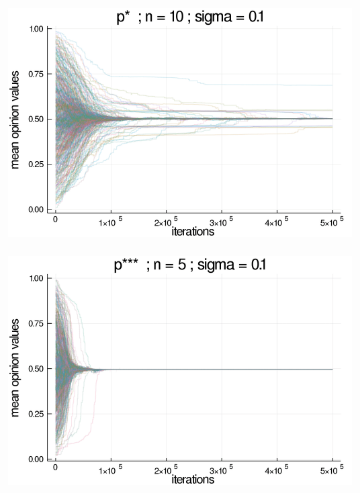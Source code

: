\documentclass{article}
\begin{document}
{\begin{figure}[H]
\begin{subfigure}[b]{0.48\textwidth}
        \includegraphics[width=\textwidth]{img/series/tseries4/Poodlcalculatepsn10-rho10e-5-sigma01-00intransrandom.png}
      \end{subfigure}
      \begin{subfigure}[b]{0.48\textwidth}
        \includegraphics[width=\textwidth]{img/series/tseries4/Poodlcalculatepsssn5-rho10e-5-sigma01-00intransrandom.png}
      \end{subfigure}

\end{figure}}
\end{document}
